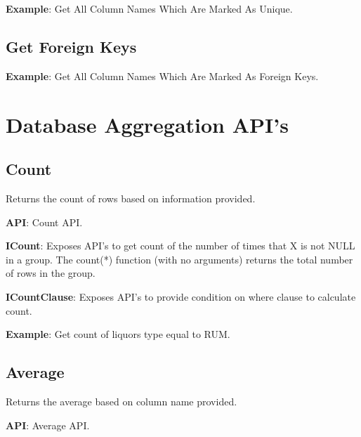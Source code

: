 				\par
				\textbf{Example}: Get All Column Names Which Are Marked As Unique.
					


	\subsection{Get Foreign Keys}
	

				\par
				\textbf{Example}: Get All Column Names Which Are Marked As Foreign Keys.
					


\section{Database Aggregation API's}


	\subsection{Count}
		\par
		Returns the count of rows based on information provided.

			\textbf{API}: Count API.
				
		
			\textbf{ICount}:  Exposes API's to get count of the number of times that X is not NULL in a group.
						 The count(*) function (with no arguments) returns the total number of rows in the group.

				

			
			\textbf{ICountClause}: Exposes API's to provide condition on where clause to calculate count.
				

			\textbf{Example}: Get count of liquors type equal to RUM.
				


	\subsection{Average} 
		\par 
		Returns the average based on column name provided.

			\textbf{API}: Average API.
				
		
